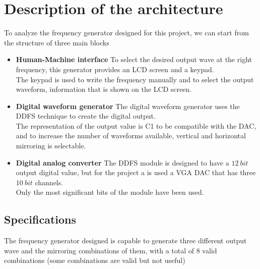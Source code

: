 \section{Description of the architecture}
\label{sec:description_of_the_architecture}

To analyze the frequency generator designed for this project, we can start from the structure of three main blocks

\begin{itemize}
        
    \item \textbf{Human-Machine interface} \newline
    To select the desired output wave at the right frequency, this generator provides an LCD screen and a keypad. \\
    The keypad is used to write the frequency manually and to select the output waveform, information that is shown on the LCD screen.

    \item \textbf{Digital waveform generator} \newline
    The digital waveform generator uses the DDFS technique to create the digital output. \\
    The representation of the output value is C1 to be compatible with the DAC, and to increase the number of waveforms available, vertical and horizontal mirroring is selectable.

    \item \textbf{Digital analog converter} \newline
    The DDFS module is designed to have a \(12 \ bit\) output digital value, but for the project a is used a VGA DAC that has three \(10 \ bit\) channels. \\
    Only the most significant bits of the module have been used.

        
\end{itemize}

\subsection{Specifications}

The frequency generator designed is capable to generate three different output wave and the mirroring combinations of them, with a total of 8 valid combinations (some combinations are valid but not useful)

